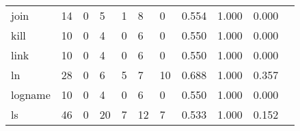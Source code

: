 \begin{longtable}{lp{1.20cm}p{1.20cm}p{1.20cm}p{1.20cm}p{1.20cm}p{1.20cm}p{1.20cm}p{1.20cm}p{1.20cm}p{1.20cm}}
join      &                                    14 &                                                  0 &                                                  5 &                                                  1 &                                                  8 &                                                  0 &                                         0.554 &                                              1.000 &                                              0.000 \\
kill      &                                    10 &                                                  0 &                                                  4 &                                                  0 &                                                  6 &                                                  0 &                                         0.550 &                                              1.000 &                                              0.000 \\
link      &                                    10 &                                                  0 &                                                  4 &                                                  0 &                                                  6 &                                                  0 &                                         0.550 &                                              1.000 &                                              0.000 \\
ln        &                                    28 &                                                  0 &                                                  6 &                                                  5 &                                                  7 &                                                 10 &                                         0.688 &                                              1.000 &                                              0.357 \\
logname   &                                    10 &                                                  0 &                                                  4 &                                                  0 &                                                  6 &                                                  0 &                                         0.550 &                                              1.000 &                                              0.000 \\
ls        &                                    46 &                                                  0 &                                                 20 &                                                  7 &                                                 12 &                                                  7 &                                         0.533 &                                              1.000 &                                              0.152 \\

\end{longtable}
